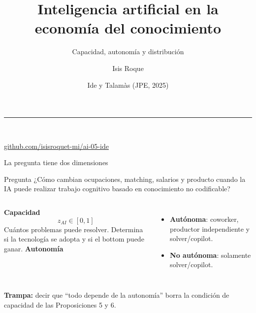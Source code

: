 \documentclass[aspectratio=169,11pt]{beamer}
\title{Inteligencia artificial en la econom\'ia del conocimiento}
\subtitle{Capacidad, autonom\'ia y distribuci\'on}
\author{Isis Roque}
\date{Ide y Talam\`as (JPE, 2025)}
\newcommand{\clave}[1]{\textcolor{Petroleo}{\textbf{#1}}}
\newcommand{\repo}{\href{https://github.com/isisroquet-mi/ai-05-ide}{github.com/isisroquet-mi/ai-05-ide}}
\begin{document}
\begingroup
{}
\begin{frame}[plain]
\vfill
\hspace{0.65cm}\begin{minipage}{0.84\paperwidth}
{\color{Turquesa}\rule{1.6cm}{2pt}}\\[0.45cm]
{\color{white}\inserttitle\par}\vspace{0.34cm}
{\large\color{Hielo}\insertsubtitle\par}\vspace{0.85cm}
{\normalsize\color{white}\insertauthor\par}
{\small\color{Hielo}\insertdate\par}\vspace{0.45cm}
{\small\color{Turquesa}\repo}
\end{minipage}
\vfill
\end{frame}
\endgroup

\begin{frame}{La pregunta tiene dos dimensiones}
\begin{block}{Pregunta}
¿C\'omo cambian ocupaciones, matching, salarios y producto cuando la IA puede realizar trabajo cognitivo basado en conocimiento no codificable?
\end{block}
\begin{columns}[T,onlytextwidth]
\clave{Capacidad}
\[z_{AI}\in[0,1]\]
{\small Cu\'antos problemas puede resolver. Determina si la tecnolog\'ia se adopta y si el bottom puede ganar.}
\clave{Autonom\'ia}
\begin{itemize}\small
\item \textbf{Aut\'onoma}: coworker, productor independiente y solver/copilot.
\item \textbf{No aut\'onoma}: solamente solver/copilot.
\end{itemize}
\end{columns}
\vspace{0.12cm}
{\small\color{Coral}\textbf{Trampa:} decir que ``todo depende de la autonom\'ia'' borra la condici\'on de capacidad de las Proposiciones 5 y 6.}
\end{frame}
\end{document}
